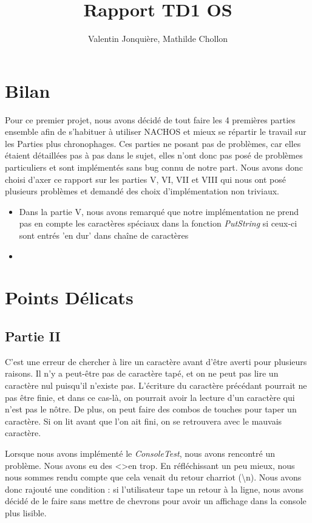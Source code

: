 \documentclass{article}
\author{
    Valentin Jonquière,
    Mathilde Chollon
}
\title{Rapport TD1 OS}
\begin{document}
\maketitle

\pagebreak

\tableofcontents

\pagebreak

\section{Bilan}

Pour ce premier projet, nous avons décidé de tout faire les 4 premières parties ensemble afin de
s'habituer à utiliser NACHOS et mieux se répartir le travail sur les Parties plus chronophages.
Ces parties ne posant pas de problèmes, car elles étaient détaillées pas à pas dans le sujet, elles n'ont
donc pas posé de problèmes particuliers et sont implémentés sans bug connu de notre part. Nous avons donc choisi
d'axer ce rapport sur les parties V, VI, VII et VIII qui nous ont posé plusieurs problèmes et demandé des choix 
d'implémentation non triviaux. 
\linebreak
\begin{itemize}
    \item Dans la partie V, nous avons remarqué que notre implémentation ne prend pas en compte les caractères spéciaux dans la fonction \textit{PutString} si ceux-ci
    sont entrés 'en dur' dans chaîne de caractères
    \item 
\end{itemize}
\section{Points Délicats}
\subsection{Partie II}
C'est une erreur de chercher à lire un caractère avant d'être averti pour
plusieurs raisons. Il n'y a peut-être pas de caractère tapé, et on ne peut pas
lire un caractère nul puisqu'il n'existe pas. L'écriture du caractère précédant
pourrait ne pas être finie, et dans ce cas-là, on pourrait avoir la lecture
d'un caractère qui n'est pas le nôtre. De plus, on peut faire des combos de
touches pour taper un caractère. Si on lit avant que l'on ait fini, on se
retrouvera avec le mauvais caractère.

Lorsque nous avons implémenté le \textit{ConsoleTest}, nous avons rencontré un
problème. Nous avons eu des \textless \textgreater en trop. En réfléchissant un
peu mieux, nous nous sommes rendu compte que cela venait du retour charriot
(\textbackslash n). Nous avons donc rajouté une condition : si l'utilisateur
tape un retour à la ligne, nous avons décidé de le faire sans mettre de
chevrons pour avoir un affichage dans la console plus lisible.
\end{document}
